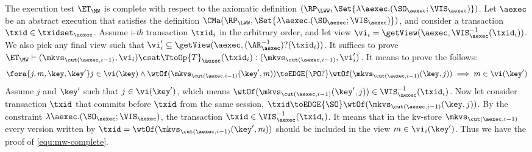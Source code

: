 The execution test $\ET_{\MW}$ is complete with respect to 
the axiomatic definition $(\RP_{\LWW}, \Set{\lambda \aexec.(\SO_{\aexec} ; \VIS_{\aexec})})$. 
Let $\aexec$ be an abstract execution that satisfies the definition
$\CMa(\RP_{\LWW}, \Set{\lambda \aexec.(\SO_{\aexec} ; \VIS_{\aexec})})$, 
and consider a transaction $\txid \in \txidset_{\aexec}$. 
Assume i-\emph{th} transaction \( \txid_i \) in the arbitrary order,
and let view \( \vi_{i} = \getView(\aexec, \VIS^{-1}_{\aexec}(\txid_{i}) ) \).
We also pick any final view such that \( \vi'_{i} \subseteq \getView(\aexec, (\AR^{-1}_{\aexec})?(\txid_{i}) ) \).
It suffices to prove \( \ET_\MW \vdash (\mkvs_{\cut(\aexec, i-1)}, \vi_i ) \csat  \TtoOp{T}_{\aexec}(\txid_{i}) : (\mkvs_{\cut(\aexec, i-1)}, \vi'_{i}) \).
It means to prove the follows:
\begin{equation}
\label{equ:mw-complete}
\begin{array}{@{}l@{}}
    \fora{j,m,\key, \key' } j \in \vi(\key)  
    \wedge \wtOf(\mkvs_{\cut(\aexec, i-1)}(\key', m)) \toEDGE{\PO?} \wtOf(\mkvs_{\cut(\aexec, i-1)}(\key, j))  
    \implies m \in \vi(\key')
\end{array}
\end{equation}
Assume \( j \) and \( \key' \) such that \( j \in \vi(\key')\), which means \( \wtOf(\mkvs_{\cut(\aexec, i-1)}(\key', j)) \in \VIS^{-1}_{\aexec}(\txid_{i}) \).
Now let consider transaction \( \txid \) that commits before \( \txid \) from the same session, \ie \( \txid \toEDGE{\SO} \wtOf(\mkvs_{\cut(\aexec, i-1)}(\key, j)) \).
By the constraint \( \lambda \aexec.(\SO_{\aexec} ; \VIS_{\aexec}) \), the transaction \( \txid \in \VIS^{-1}_{\aexec}(\txid_{i}) \).
It means that in the kv-store \(  \mkvs_{\cut(\aexec, i-1)} \) every version written by \( \txid =  \wtOf(\mkvs_{\cut(\aexec, i-1)}(\key', m)) \) should be included in the view \( m \in \vi_i(\key') \).
Thus we have the proof of \cref{equ:mw-complete}.
